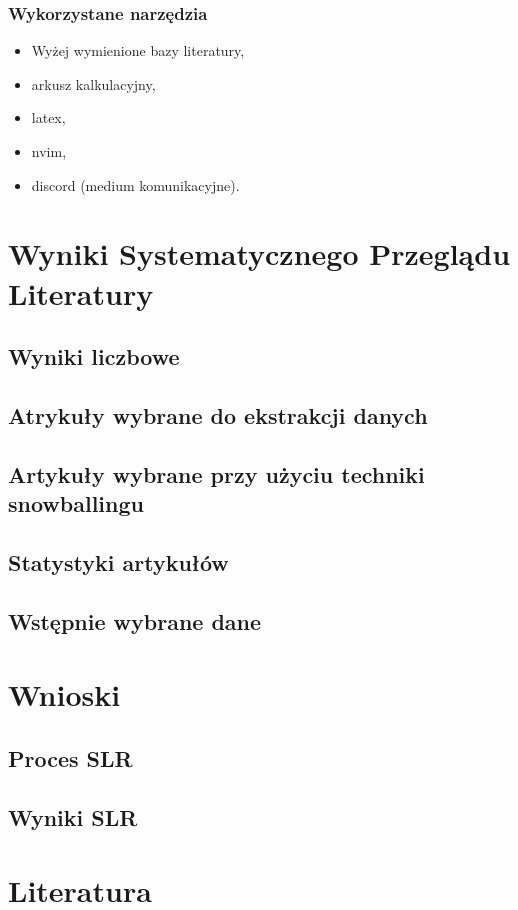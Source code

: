 \documentclass[polish,envcountsect,10pt]{article}
\begin{document}
\subsubsection{Wykorzystane narzędzia}

\begin{itemize}
	\item Wyżej wymienione bazy literatury,
	\item arkusz kalkulacyjny,
	\item latex,
	\item nvim,
	\item discord (medium komunikacyjne).
\end{itemize}

\section{Wyniki Systematycznego Przeglądu Literatury}

\subsection{Wyniki liczbowe}

\subsection{Atrykuły wybrane do ekstrakcji danych}

\subsection{Artykuły wybrane przy użyciu techniki snowballingu}

\subsection{Statystyki artykułów}

\subsection{Wstępnie wybrane dane}

\section{Wnioski}

\subsection{Proces SLR}

\subsection{Wyniki SLR}

\section{Literatura}
\end{document}
